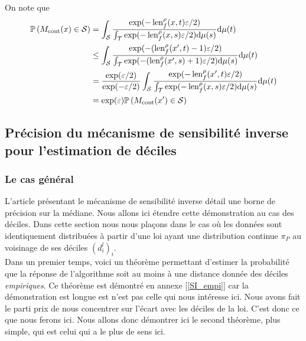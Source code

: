 On note que 
\begin{align*}
    \mathbb P\left( M_{\text{cont}}(x) \in \mathcal S \right) & = \int_\mathcal S \dfrac{\exp(-\operatorname{len}_f^\rho(x, t)\varepsilon/2)}{\int_\mathcal T \exp(-\operatorname{len}_f^\rho(x, s)\varepsilon/2)\mathrm{d} \mu(s)}    \mathrm{d} \mu(t)\\
    & \leq \int_\mathcal S \dfrac{\exp(-(\operatorname{len}_f^\rho(x', t)-1)\varepsilon/2)}{\int_\mathcal T \exp(-(\operatorname{len}_f^\rho(x', s)+1)\varepsilon/2)\mathrm{d} \mu(s)}    \mathrm{d} \mu(t)\\
    & = \dfrac{\exp(\varepsilon/2)}{\exp(-\varepsilon/2)}\int_\mathcal S \dfrac{\exp(-\operatorname{len}_f^\rho(x', t)\varepsilon/2)}{\int_\mathcal T \exp(-\operatorname{len}_f^\rho(x, s)\varepsilon/2)\mathrm{d} \mu(s)}    \mathrm{d} \mu(t)\\
    & = \exp(\varepsilon) \mathbb P\left( M_{\text{cont}}(x') \in \mathcal S \right)
\end{align*}


\subsection{Précision du mécanisme de sensibilité inverse pour l'estimation de déciles}



\subsubsection{Le cas général}

L'article présentant le mécanisme de sensibilité inverse \cite{Asi2020NearII} détail une borne de précision sur la médiane. Nous allons ici étendre cette démonstration au cas des déciles. Dans cette section nous nous plaçons dans le cas où les données sont identiquement distribuées à partir d'une loi ayant une distribution continue \(\pi_P\) au voisinage de ses déciles \((d_i^l)_i\).\\

Dans un premier temps, voici un théorème permettant d'estimer la probabilité que la réponse de l'algorithme soit au moins à une distance donnée des déciles \textit{empiriques}. Ce théorème est démontré en annexe [\ref{SI_empi}] car la démonstration est longue est n'est pas celle qui nous intéresse ici. Nous avons fait le parti prix de nous concentrer sur l'écart avec les déciles de la loi. C'est donc ce que nous ferons ici. Nous allons donc démontrer ici le second théorème, plus simple, qui est celui qui a le plus de sens ici. \\



